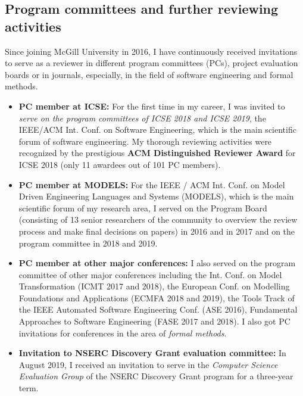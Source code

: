 \subsection{Program committees and further reviewing activities}
Since joining McGill University in 2016, I have continuously received invitations to serve as a reviewer in different program committees (PCs), project evaluation boards or in journals, especially, in the field of software engineering and formal methods. 

\begin{itemize}[leftmargin=0.5cm]
\item \textbf{PC member at ICSE:}
For the first time in my career, I was invited to \emph{serve on the program committees of ICSE 2018 and ICSE 2019}, the IEEE/ACM Int. Conf. on Software Engineering, which is the main scientific forum of software engineering. My thorough reviewing activities were recognized by the prestigious \textbf{ACM Distinguished Reviewer Award} for ICSE 2018 (only 11 awardees out of 101 PC members). 

\item \textbf{PC member at MODELS:}
For the IEEE / ACM Int. Conf. on Model Driven Engineering Languages and Systems (MODELS), which is the main scientific forum of my research area, I served on the Program Board (consisting of 13 senior researchers of the community to overview the review process and make final decisions on papers) in 2016 and in 2017 and on the program committee in 2018 and 2019. 

\item \textbf{PC member at other major conferences:}
I also served on the program committee of other major %
conferences including the 
Int. Conf. on Model Transformation (ICMT 2017 and 2018), the European Conf. on Modelling Foundations and Applications (ECMFA 2018 and 2019), the Tools Track of the IEEE Automated Software Engineering Conf. (ASE 2016), Fundamental Approaches to Software Engineering (FASE 2017 and 2018). I also got PC invitations for conferences in the area of \emph{formal methods}.

\item \textbf{Invitation to NSERC Discovery Grant evaluation committee:}
In August 2019, I received an invitation to serve in the \emph{Computer Science Evaluation Group} of the NSERC Discovery Grant program for a three-year term. 


\end{itemize}
